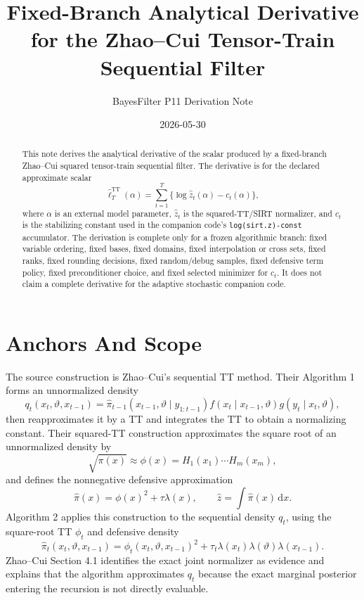 \documentclass[11pt]{article}
\title{Fixed-Branch Analytical Derivative for the Zhao--Cui Tensor-Train Sequential Filter}
\author{BayesFilter P11 Derivation Note}
\date{2026-05-30}
\newcommand{\dd}{\mathrm{d}}
\newcommand{\TT}{\mathrm{TT}}
\begin{document}
\maketitle

\begin{abstract}
This note derives the analytical derivative of the scalar produced by a
fixed-branch Zhao--Cui squared tensor-train sequential filter.  The derivative
is for the declared approximate scalar
\[
  \widehat\ell_T^{\TT}(\alpha)
  =
  \sum_{t=1}^T \{\log \widehat z_t(\alpha)-c_t(\alpha)\},
\]
where \(\alpha\) is an external model parameter, \(\widehat z_t\) is the
squared-TT/SIRT normalizer, and \(c_t\) is the stabilizing constant used in the
companion code's \texttt{log(sirt.z)-const} accumulator.  The derivation is
complete only for a frozen algorithmic branch: fixed variable ordering, fixed
bases, fixed domains, fixed interpolation or cross sets, fixed ranks, fixed
rounding decisions, fixed random/debug samples, fixed defensive term policy,
fixed preconditioner choice, and fixed selected minimizer for \(c_t\).  It does
not claim a complete derivative for the adaptive stochastic companion code.
\end{abstract}

\section{Anchors And Scope}

The source construction is Zhao--Cui's sequential TT method.  Their Algorithm 1
forms an unnormalized density
\[
  q_t(x_t,\vartheta,x_{t-1})
  =
  \widehat\pi_{t-1}(x_{t-1},\vartheta\mid y_{1:t-1})
  f(x_t\mid x_{t-1},\vartheta)
  g(y_t\mid x_t,\vartheta),
  \tag{ZC-12}
\]
then reapproximates it by a TT and integrates the TT to obtain a normalizing
constant.  Their squared-TT construction approximates the square root of an
unnormalized density by
\[
  \sqrt{\pi(x)}
  \approx
  \phi(x)=H_1(x_1)\cdots H_m(x_m),
\]
and defines the nonnegative defensive approximation
\[
  \widehat\pi(x)=\phi(x)^2+\tau\lambda(x),\qquad
  \widehat z=\int \widehat\pi(x)\,\dd x.
  \tag{ZC-13}
\]
Algorithm 2 applies this construction to the sequential density \(q_t\), using
the square-root TT \(\phi_t\) and defensive density
\[
  \widehat\pi_t(x_t,\vartheta,x_{t-1})
  =
  \phi_t(x_t,\vartheta,x_{t-1})^2
  +
  \tau_t\lambda(x_t)\lambda(\vartheta)\lambda(x_{t-1}).
  \tag{ZC-16}
\]
Zhao--Cui Section 4.1 identifies the exact joint normalizer as evidence and
explains that the algorithm approximates \(q_t\) because the exact marginal
posterior entering the recursion is not directly evaluable.
\end{document}
